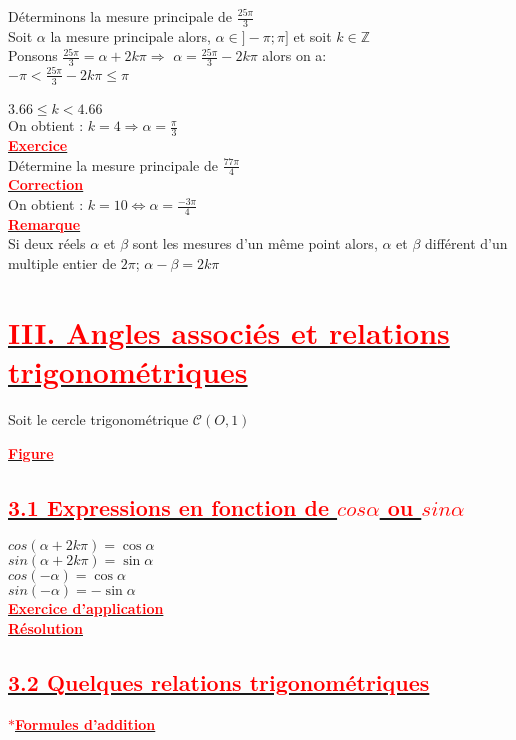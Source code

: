 \documentclass[12pt]{article}
\begin{document}
Déterminons la mesure principale de $\frac{25\pi}{3}$\\
Soit $\alpha$ la mesure principale alors, $\alpha \in ]-\pi ; \pi]$ et soit $k\in\mathbb{Z}$\\
Ponsons $\frac{25\pi}{3}=\alpha+2k\pi \Longrightarrow $ $\alpha=\frac{25\pi}{3}-2k\pi$ alors on a:\\
$-\pi<\frac{25\pi}{3}-2k\pi\leq \pi$\\
\\
$3.66 \leq k < 4.66$\\
On obtient : $k=4 \Longrightarrow \alpha = \frac{\pi}{3}$\\
\underline{\textbf{\textcolor{red}{Exercice}}}\\
Détermine la mesure principale de $\frac{77\pi}{4}$\\
\underline{\textbf{\textcolor{red}{Correction}}}\\
On obtient : $k=10 \Longleftrightarrow \alpha=\frac{-3\pi}{4}$\\
\underline{\textbf{\textcolor{red}{Remarque}}}\\ 
Si deux réels $\alpha$ et $\beta$ sont les mesures d'un même point alors, $\alpha$ et $\beta$ différent d'un multiple entier de $2\pi$; $\alpha-\beta = 2k\pi$
\section*{\underline{\textbf{\textcolor{red}{III. Angles associés et relations trigonométriques}}}}
Soit le cercle trigonométrique $\mathcal{C}(O,1)$\\
\begin{center}
\underline{\textbf{\textcolor{red}{Figure}}}\\
\end{center}
\subsection*{\underline{\textbf{\textcolor{red}{3.1 Expressions en fonction de $cos\alpha$ ou $sin\alpha$}}}}
$cos(\alpha+2k\pi)=\cos \alpha$\\
$sin(\alpha+2k\pi)=\sin \alpha$\\
$cos(-\alpha)=\cos \alpha$\\
$sin(-\alpha)=-\sin \alpha$\\

\underline{\textbf{\textcolor{red}{Exercice d'application }}}\\
\underline{\textbf{\textcolor{red}{Résolution }}}
\subsection*{\underline{\textbf{\textcolor{red}{3.2 Quelques relations trigonométriques}}}}
\underline{\textbf{\textcolor{red}{$\ast$Formules d'addition}}}\\
\end{document}
